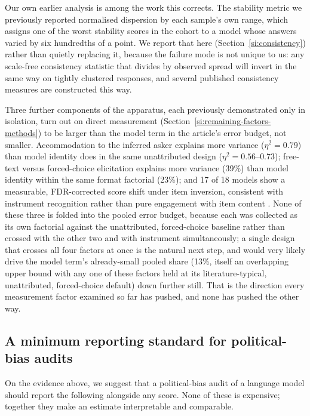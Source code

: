 \documentclass[11pt]{article}
\begin{document}
Our own earlier analysis is among the work this corrects. The stability
metric we previously reported normalised dispersion by each sample's own
range, which assigns one of the worst stability scores in the cohort to a
model whose answers varied by six hundredths of a point. We report that
here (Section~\ref{si:consistency}) rather than quietly replacing it,
because the failure mode is not unique to us: any scale-free consistency
statistic that divides by observed spread will invert in the same way on
tightly clustered responses, and several published consistency measures are
constructed this way.

Three further components of the apparatus, each previously demonstrated
only in isolation, turn out on direct measurement
(Section~\ref{si:remaining-factors-methods}) to be larger than the model
term in the article's error budget, not smaller. Accommodation to the
inferred asker \citep{tornberg2026sycophancy} explains more variance
($\eta^2=0.79$) than model identity does in the same unattributed design
($\eta^2=0.56$--$0.73$); free-text versus forced-choice elicitation
\citep{rottger2024} explains more variance (39\%) than model identity within
the same format factorial (23\%); and 17 of 18 models show a measurable,
FDR-corrected score shift under item inversion, consistent with instrument
recognition rather than pure engagement with item content
\citep{bianchi2026plasticity}. None of these three is folded into the
pooled error budget, because each was collected as its own factorial
against the unattributed, forced-choice baseline rather than crossed with
the other two and with instrument simultaneously; a single design that
crosses all four factors at once is the natural next step, and would very
likely drive the model term's already-small pooled share (13\%, itself an
overlapping upper bound with any one of these factors held at its
literature-typical, unattributed, forced-choice default) down further
still. That is the direction every measurement factor examined so far has
pushed, and none has pushed the other way.

\subsection*{A minimum reporting standard for political-bias audits}
\label{si:box1}

On the evidence above, we suggest that a political-bias audit of a language
model should report the following alongside any score. None of these is
expensive; together they make an estimate interpretable and comparable.
\end{document}
